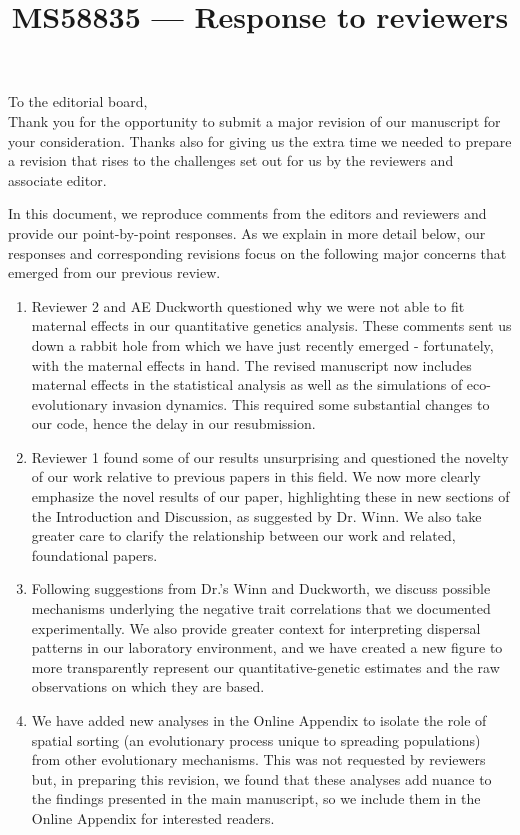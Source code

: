 \documentclass[12pt]{article}
\begin{document}
\title{MS58835 --- Response to reviewers}

\maketitle
\noindent To the editorial board,\\

Thank you for the opportunity to submit a major revision of our manuscript for your consideration. Thanks also for giving us the extra time we needed to prepare a revision that rises to the challenges set out for us by the reviewers and associate editor. 

In this document, we reproduce comments from the editors and reviewers and provide our point-by-point responses. As we explain in more detail below, our responses and corresponding revisions focus on the following major concerns that emerged from our previous review.
\begin{enumerate}
\item{Reviewer 2 and AE Duckworth questioned why we were not able to fit maternal effects in our quantitative genetics analysis. 
These comments sent us down a rabbit hole from which we have just recently emerged - fortunately, with the maternal effects in hand. 
The revised manuscript now includes maternal effects in the statistical analysis as well as the simulations of eco-evolutionary invasion dynamics.
This required some substantial changes to our code, hence the delay in our resubmission.}
\item{Reviewer 1 found some of our results unsurprising and questioned the novelty of our work relative to previous papers in this field. 
We now more clearly emphasize the novel results of our paper, highlighting these in new sections of the Introduction and Discussion, as suggested by Dr. Winn.
We also take greater care to clarify the relationship between our work and related, foundational papers.}
\item{Following suggestions from Dr.'s Winn and Duckworth, we discuss possible mechanisms underlying the negative trait correlations that we documented experimentally. 
We also provide greater context for interpreting dispersal patterns in our laboratory environment, and we have created a new figure to more transparently represent our quantitative-genetic estimates and the raw observations on which they are based.}
\item{We have added new analyses in the Online Appendix to isolate the role of spatial sorting (an evolutionary process unique to spreading populations) from other evolutionary mechanisms.
This was not requested by reviewers but, in preparing this revision, we found that these analyses add nuance to the findings presented in the main manuscript, so we include them in the Online Appendix for interested readers.}
\end{enumerate}
\end{document}
